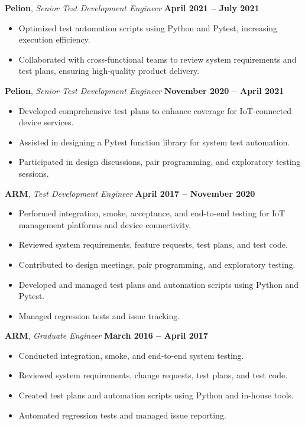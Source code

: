 \documentclass[12pt]{article}
\begin{document}
\textbf{Pelion}, \textit{Senior Test Development Engineer} \hfill \textbf{April 2021 – July 2021}
\begin{itemize}[leftmargin=1.5em]
    \item Optimized test automation scripts using Python and Pytest, increasing execution efficiency.
    \item Collaborated with cross-functional teams to review system requirements and test plans, ensuring high-quality product delivery.
\end{itemize}

\textbf{Pelion}, \textit{Senior Test Development Engineer} \hfill \textbf{November 2020 – April 2021}
\begin{itemize}[leftmargin=1.5em]
    \item Developed comprehensive test plans to enhance coverage for IoT-connected device services.
    \item Assisted in designing a Pytest function library for system test automation.
    \item Participated in design discussions, pair programming, and exploratory testing sessions.
\end{itemize}

\textbf{ARM}, \textit{Test Development Engineer} \hfill \textbf{April 2017 – November 2020}
\begin{itemize}[leftmargin=1.5em]
    \item Performed integration, smoke, acceptance, and end-to-end testing for IoT management platforms and device connectivity.
    \item Reviewed system requirements, feature requests, test plans, and test code.
    \item Contributed to design meetings, pair programming, and exploratory testing.
    \item Developed and managed test plans and automation scripts using Python and Pytest.
    \item Managed regression tests and issue tracking.
\end{itemize}

\textbf{ARM}, \textit{Graduate Engineer} \hfill \textbf{March 2016 – April 2017}
\begin{itemize}[leftmargin=1.5em]
    \item Conducted integration, smoke, and end-to-end system testing.
    \item Reviewed system requirements, change requests, test plans, and test code.
    \item Created test plans and automation scripts using Python and in-house tools.
    \item Automated regression tests and managed issue reporting.
\end{itemize}
\end{document}
